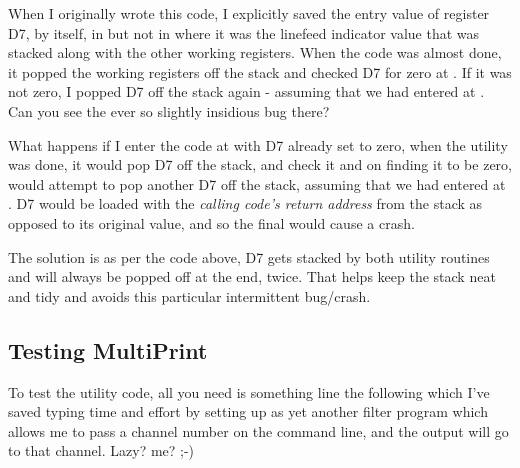 When I originally wrote this code, I explicitly saved the entry value of register D7, by itself, in  but not in  where it was the linefeed indicator value that was stacked along with the other working registers. When the code was almost done, it popped the working registers off the stack and checked D7 for zero at . If it was not zero, I popped D7 off the stack again - assuming that we had entered at . Can you see the ever so slightly insidious bug there?

What happens if I enter the code at  with D7 already set to zero, when the utility was done, it would pop D7 off the stack, and check it and on finding it to be zero, would attempt to pop another D7 off the stack, assuming that we had entered at . D7 would be loaded with the \emph{calling code's return address} from the stack as opposed to its original value, and so the final  would cause a crash.

The solution is as per the code above, D7 gets stacked by both utility routines and will always be popped off at the end, twice. That helps keep the stack neat and tidy and avoids this particular intermittent bug/crash.


\subsection{Testing MultiPrint}
To test the utility code, all you need is something line the following which I've saved typing time and effort by setting up as yet another filter program which allows me to pass a channel number on the command line, and the output will go to that channel. Lazy? me? ;-)

